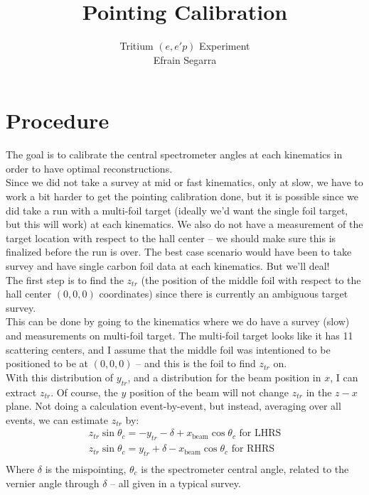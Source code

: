 \documentclass{article}
\title{Pointing Calibration}
\author{Tritium $(e,e'p)$ Experiment\\Efrain Segarra}
\begin{document}
\maketitle


\section*{Procedure}
The goal is to calibrate the central spectrometer angles at each kinematics in order to have optimal reconstructions.\\

Since we did not take a survey at mid or fast kinematics, only at slow, we have to work a bit harder to get the pointing calibration done, but it is possible since we did take a run with a multi-foil target (ideally we'd want the single foil target, but this will work) at each kinematics. We also do not have a measurement of the target location with respect to the hall center -- we should make sure this is finalized before the run is over. The best case scenario would have been to take survey and have single carbon foil data at each kinematics. But we'll deal!\\

The first step is to find the $z_{tr}$ (the position of the middle foil with respect to the hall center $(0,0,0)$ coordinates) since there is currently an ambiguous target survey.\\

This can be done by going to the kinematics where we do have a survey (slow) and measurements on multi-foil target. The multi-foil target looks like it has 11 scattering centers, and I assume that the middle foil was intentioned to be positioned to be at $(0,0,0)$ -- and this is the foil to find $z_{tr}$ on.\\

With this distribution of $y_{tr}$, and a distribution for the beam position in $x$, I can extract $z_{tr}$. Of course, the $y$ position of the beam will not change $z_{tr}$ in the $z-x$ plane. Not doing a calculation event-by-event, but instead, averaging over all events, we can estimate $z_{tr}$ by:
\begin{equation*}
	\begin{gathered}
		z_{tr} \sin{\theta_c} = -y_{tr} - \delta + x_\textrm{beam} \cos{\theta_c} \textrm{     for LHRS} \\
		z_{tr} \sin{\theta_c} = y_{tr} + \delta - x_\textrm{beam} \cos{\theta_c} \textrm{     for RHRS} \\
	\end{gathered}
\end{equation*}
Where $\delta$ is the mispointing, $\theta_c$ is the spectrometer central angle, related to the vernier angle through $\delta$ -- all given in a typical survey.\\
\end{document}

